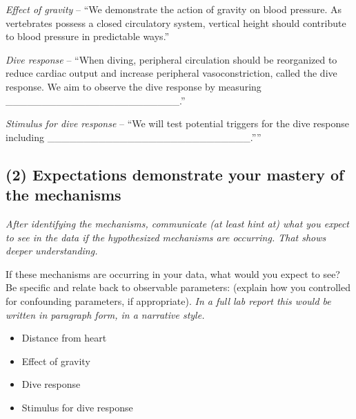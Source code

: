 \documentclass[
  letterpaper,
  DIV=11,
  numbers=noendperiod]{scrartcl}
\begin{document}
\emph{Effect of gravity} -- ``We demonstrate the action of gravity on
blood pressure. As vertebrates possess a closed circulatory system,
vertical height should contribute to blood pressure in predictable
ways.''

\emph{Dive response} -- ``When diving, peripheral circulation should be
reorganized to reduce cardiac output and increase peripheral
vasoconstriction, called the dive response. We aim to observe the dive
response by measuring
\_\_\_\_\_\_\_\_\_\_\_\_\_\_\_\_\_\_\_\_\_\_\_\_.''

\emph{Stimulus for dive response} -- ``We will test potential triggers
for the dive response including
\_\_\_\_\_\_\_\_\_\_\_\_\_\_\_\_\_\_\_\_\_\_\_\_\_\_\_\_.''''

\hypertarget{expectations-demonstrate-your-mastery-of-the-mechanisms}{%
\subsection{\texorpdfstring{\textbf{(2) Expectations demonstrate your
mastery of the
mechanisms}}{(2) Expectations demonstrate your mastery of the mechanisms}}\label{expectations-demonstrate-your-mastery-of-the-mechanisms}}

\begin{tcolorbox}[enhanced jigsaw, toptitle=1mm, colframe=quarto-callout-tip-color-frame, rightrule=.15mm, breakable, left=2mm, colbacktitle=quarto-callout-tip-color!10!white, arc=.35mm, bottomrule=.15mm, coltitle=black, bottomtitle=1mm, titlerule=0mm, opacitybacktitle=0.6, opacityback=0, toprule=.15mm, colback=white, title=\textcolor{quarto-callout-tip-color}{\faLightbulb}\hspace{0.5em}{Notes}, leftrule=.75mm]

\emph{After identifying the mechanisms, communicate (at least hint at)
what you expect to see in the data if the hypothesized mechanisms are
occurring. That shows deeper understanding.}

\end{tcolorbox}

If these mechanisms are occurring in your data, what would you expect to
see? Be specific and relate back to observable parameters: (explain how
you controlled for confounding parameters, if appropriate). \emph{In a
full lab report this would be written in paragraph form, in a narrative
style.}

\begin{itemize}
\item
  Distance from heart
\item
  Effect of gravity
\item
  Dive response
\item
  Stimulus for dive response
\end{itemize}
\end{document}

